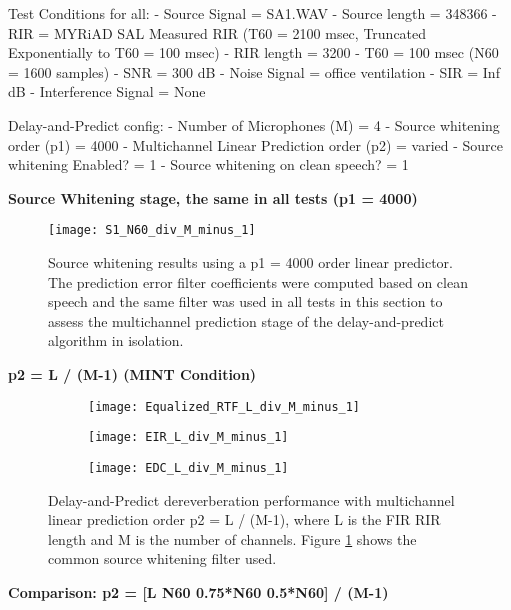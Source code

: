 Test Conditions for all:
- Source Signal = SA1.WAV
- Source length = 348366
- RIR = MYRiAD SAL Measured RIR (T60 = 2100 msec, Truncated Exponentially to T60 = 100 msec)
- RIR length = 3200
- T60 = 100 msec (N60 = 1600 samples)
- SNR = 300 dB
- Noise Signal = office ventilation
- SIR = Inf dB
- Interference Signal = None

Delay-and-Predict config:
- Number of Microphones (M) = 4
- Source whitening order (p1) = 4000
- Multichannel Linear Prediction order (p2) = varied
- Source whitening Enabled? = 1
- Source whitening on clean speech? = 1

\textbf{Source Whitening stage, the same in all tests (p1 = 4000)}

\begin{figure}[H]
	\texttt{[image: S1\_N60\_div\_M\_minus\_1]}
	\centering
	\caption{Source whitening results using a p1 = 4000 order linear predictor. The prediction error filter coefficients were computed based on clean speech and the same filter was used in all tests in this section to assess the multichannel prediction stage of the delay-and-predict algorithm in isolation.}
	\label{fig:params_p2_stage1}
\end{figure}

\textbf{p2 = L / (M-1) (MINT Condition)}

\begin{figure}[H]
	\centering
	\begin{subfigure}[b]{0.32\textwidth}
		\centering
		\texttt{[image: Equalized\_RTF\_L\_div\_M\_minus\_1]}
	\end{subfigure}
	\hfill
	\begin{subfigure}[b]{0.32\textwidth}
		\centering
		\texttt{[image: EIR\_L\_div\_M\_minus\_1]}
	\end{subfigure}
	\hfill
	\begin{subfigure}[b]{0.32\textwidth}
		\centering
		\texttt{[image: EDC\_L\_div\_M\_minus\_1]}
	\end{subfigure}
	\hfill
	\caption{Delay-and-Predict dereverberation performance with multichannel linear prediction order p2 = L / (M-1), where L is the FIR RIR length and M is the number of channels. Figure \ref{fig:params_p2_stage1} shows the common source whitening filter used.}
	\label{fig:params_p2_L}
\end{figure}

\textbf{Comparison: p2 = [L  N60  0.75*N60  0.5*N60] / (M-1)}

